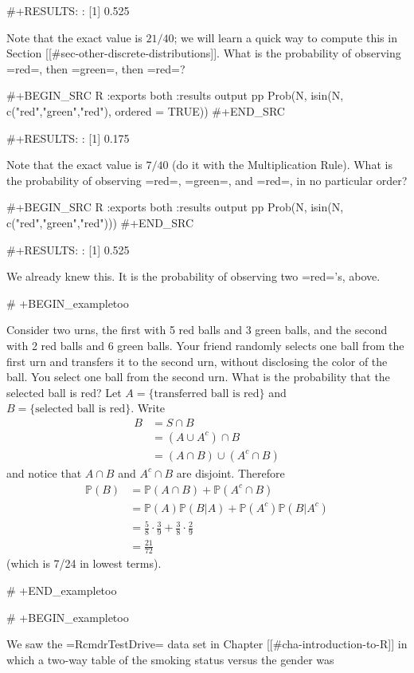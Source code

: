#+RESULTS:
: [1] 0.525

Note that the exact value is \(21/40\); we will learn a quick way to
compute this in Section [[#sec-other-discrete-distributions]]. What is the
probability of observing =red=, then =green=, then =red=?

#+BEGIN_SRC R :exports both :results output pp  
Prob(N, isin(N, c("red","green","red"), ordered = TRUE))
#+END_SRC

#+RESULTS:
: [1] 0.175

Note that the exact value is \(7/40\) (do it with the Multiplication
Rule). What is the probability of observing =red=, =green=, and =red=,
in no particular order?

#+BEGIN_SRC R :exports both :results output pp  
Prob(N, isin(N, c("red","green","red")))
#+END_SRC

#+RESULTS:
: [1] 0.525

We already knew this. It is the probability of observing two =red='s,
above.

# +BEGIN_exampletoo

Consider two urns, the first with 5 red balls and 3 green balls, and
the second with 2 red balls and 6 green balls. Your friend randomly
selects one ball from the first urn and transfers it to the second
urn, without disclosing the color of the ball. You select one ball
from the second urn. What is the probability that the selected ball is
red? Let \( A = \{ \mbox{transferred ball is red} \} \) and \( B = \{
\mbox{selected ball is red} \} \). Write
\begin{align*}
B & =S\cap B\\
 & =(A\cup A^{c})\cap B\\
 & =(A\cap B)\cup(A^{c}\cap B)
\end{align*}
and notice that \(A\cap B\) and \(A^{c}\cap B\) are disjoint. Therefore
\begin{align*}
\mathbb{P}(B) & =\mathbb{P}(A\cap B)+\mathbb{P}(A^{c}\cap B)\\
 & =\mathbb{P}(A)\mathbb{P}(B|A)+\mathbb{P}(A^{c})\mathbb{P}(B|A^{c})\\
 & =\frac{5}{8}\cdot\frac{3}{9}+\frac{3}{8}\cdot\frac{2}{9}\\
 & =\frac{21}{72}\ 
\end{align*}
(which is 7/24 in lowest terms).

# +END_exampletoo


# +BEGIN_exampletoo

We saw the =RcmdrTestDrive= data set in Chapter [[#cha-introduction-to-R]]
in which a two-way table of the smoking status versus the gender was

